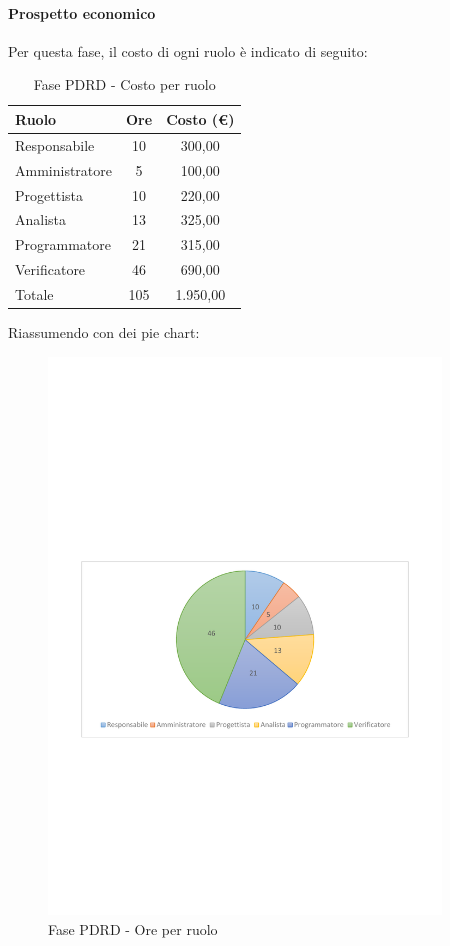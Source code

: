 \documentclass[../PianoProgetto.tex]{subfiles}
\begin{document}
	\paragraph{Prospetto economico}
					Per questa fase\g, il costo di ogni ruolo è indicato di seguito:
	\begin{table}[h]
		\centering
	
		\begin{tabular}{l * {2}{c}}
			\toprule
			\textbf{Ruolo} & \textbf{Ore} & \textbf{Costo (\euro{})} \\
			\midrule
			Responsabile &	10 & 300,00 \\
			Amministratore & 5 & 100,00 \\
			Progettista & 10 & 220,00 \\
			Analista & 13 & 325,00 \\
			Programmatore & 21 & 315,00 \\
			Verificatore & 46 & 690,00 \\
			\midrule		
			Totale & 105 & 1.950,00 \\
			\bottomrule
		\end{tabular}
		\caption{Fase PDRD - Costo per ruolo}
		\label{tab:fasePDRD_costo}
	\end{table}
\vfill	
	Riassumendo con dei pie chart:
	\begin{figure}[!h]
		\centering
		\includegraphics[width=0.93\textwidth , trim=2cm 9.5cm 2cm 11cm]{grafici/PDRD/PDRD-ore-ruolo}
			\caption{Fase PDRD - Ore per ruolo}
		\label{fig:CircleChart-fasePDRD_ore_r}
	\end{figure}
\end{document}
